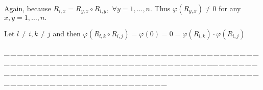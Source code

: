 \documentclass[a4paper, 11pt, UTF8]{article}
\begin{document}
\begin{large}
Again, because $R_{i,x}=R_{y,x}\circ R_{i,y},\,\,\forall y=1,\dots,n.$ Thus $\varphi(R_{y,x})\neq 0$ for any $x,y=1,\dots,n.$\par\quad
Let $l\neq i,k\neq j$ and then $\varphi(R_{l,k}\circ R_{i,j})=\varphi(0)=0=\varphi(R_{l,k})\cdot\varphi(R_{i,j})$\par
{}\large
{\tiny \_\,\_\,\_\,\_\,\_\,\_\,\_\,\_\,\_\,\_\,\_\,\_\,\_\,\_\,\_\,\_\,\_\,\_\,\_\,\_\,\_\,\_\,\_\,\_\,\_\,\_\,\_\,\_\,\_\,\_\,\_\,\_\,\_\,\_\,\_\,\_\,\_\,\_\,\_\,\_\,\_\,\_\,\_\,\_\,\_\,\_\,\_\,\_\,\_\,\_\,\_\,\_\,\_\,\_\,\_\,\_\,\_\,\_\,\_\,\_\,\_\,\_\,\_\,\_\,\_\,\_\,\_\,\_\,\_\,\_\,\_\_\,\_\,\_\,\_\,\_\,\_\,\_\,\_\,\_\,\_\,\_\,\_\,\_\,\_\,\_\,\_\,\_\,\_\,\_\,\_\,\_\,\_\,\_\,\_\,\_\,\_\,\_\,\_\,\_\,\_\,\_\,\_\,\_\,\_\,\_\,\_\,\_\,\_\,\_\,\_\,\_\,\_\,\_\,\_\,\_\,\_\,\_\,\_\,\_\,\_\,\_\,\_\,\_\,\_\,\_\,\_\,\_\,\_\,\_\,\_\,\_\,\_\,\_\,\_\,\_\,\_\,\_\,\_\,\_\,\_\,\_}\par


\end{large}
\end{document}
